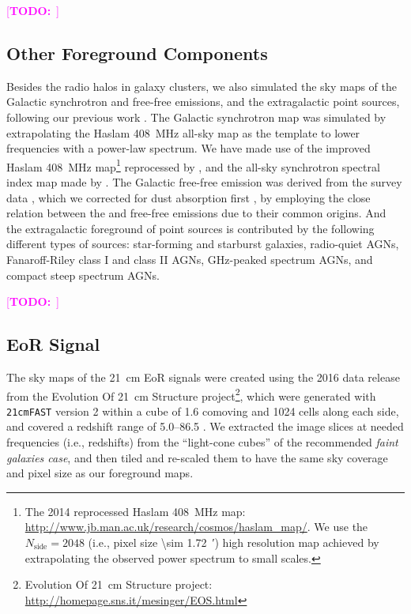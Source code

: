 \documentclass[modern]{aastex62}
\newcommand{\R}[1]{\mathrm{#1}}
\newcommand{\Halpha}{\text{H$\alpha$}}
\newcommand{\TODO}[1]{\textcolor{magenta}{[\textbf{TODO:}~\uuline{#1}]}}
\begin{document}
\TODO{figures ...}

\subsection{Other Foreground Components}
\label{sec:fg-other}

Besides the radio halos in galaxy clusters, we also simulated the sky maps
of the Galactic synchrotron and free-free emissions, and the extragalactic
point sources, following our previous work \citep{wang2010}.
The Galactic synchrotron map was simulated by extrapolating the
Haslam \SI{408}{\MHz} all-sky map as the template to lower frequencies
with a power-law spectrum.
We have made use of the improved Haslam \SI{408}{\MHz} map\footnote{%
  The 2014 reprocessed Haslam \SI{408}{\MHz} map:
  \url{http://www.jb.man.ac.uk/research/cosmos/haslam_map/}.
  We use the $N_{\R{side}} = 2048$ (i.e., pixel size \SI{\sim 1.72}{\arcmin})
  high resolution map achieved by extrapolating the observed power spectrum
  to small scales.}
reprocessed by \citet{remazeilles2015},
and the all-sky synchrotron spectral index map made by \citet{giardino2002}.
The Galactic free-free emission was derived from the \Halpha{} survey data
\citep{finkbeiner2003}, which we corrected for dust absorption first
\citep{dickinson2003}, by employing the close relation between the \Halpha{}
and free-free emissions due to their common origins.
And the extragalactic foreground of point sources is contributed by the
following different types of sources: star-forming and starburst galaxies,
radio-quiet AGNs, Fanaroff-Riley class I and class II AGNs, GHz-peaked
spectrum AGNs, and compact steep spectrum AGNs.

\TODO{figures ...}


\subsection{EoR Signal}
\label{sec:eor-signal}

The sky maps of the 21~cm EoR signals were created using the 2016
data release from the Evolution Of 21~cm Structure project\footnote{%
  Evolution Of 21~cm Structure project:
  \url{http://homepage.sns.it/mesinger/EOS.html}},
which were generated with \texttt{21cmFAST} version 2 \citep{mesinger2011}
within a cube of 1.6 comoving \si{\Gpc} and 1024 cells along each side,
and covered a redshift range of \numrange{5.0}{86.5} \citep{mesinger2016}.
We extracted the image slices at needed frequencies (i.e., redshifts) from
the \enquote{light-cone cubes} of the recommended \emph{faint galaxies case},
and then tiled and re-scaled them to have the same sky coverage and pixel
size as our foreground maps.
\end{document}
